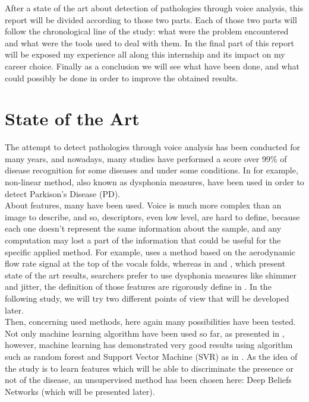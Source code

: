\documentclass{report}
\begin{document}
	After a state of the art about detection of pathologies through voice analysis, this report will be divided according to those two parts. Each of those two parts will follow the chronological line of the study: what were the problem encountered and what were the tools used to deal with them. In the final part of this report will be exposed my experience all along this internship and its impact on my career choice. Finally as a conclusion we will see what have been done, and what could possibly be done in order to improve the obtained results.\\
	
	\chapter{State of the Art}
	
	The attempt to detect pathologies through voice analysis has been conducted for many years, and nowadays, many studies have performed a score over 99\% of disease recognition for some diseases and under some conditions. In \cite{little2006nonlinear} for example, non-linear method, also known as dysphonia measures, have been used in order to detect Parkison's Disease (PD).\\
	
	About features, many have been used. Voice is much more complex than an image to describe, and so, descriptors, even low level, are hard to define, because each one doesn't represent the same information about the sample, and any computation may lost a part of the information that could be useful for the specific applied method. For example, \cite{little2006nonlinear} uses a method based on the aerodynamic flow rate signal at the top of the vocals folds, whereas in \cite{tsanas2012novel} and \cite{tsanas2012using}, which present state of the art results, searchers prefer to use dysphonia measures like shimmer and jitter, the definition of those features are rigorously define in \cite{tsanas2011nonlinear}. In the following study, we will try two different points of view that will be developed later.\\
	
	Then, concerning used methods, here again many possibilities have been tested. Not only machine learning algorithm have been used so far, as presented in \cite{little2006nonlinear}, however, machine learning has demonstrated very good results using algorithm such as random forest and Support Vector Machine (SVR) as in \cite{tsanas2012novel}. As the idea of the study is to learn features which will be able to discriminate the presence or not of the disease, an unsupervised method has been chosen here: Deep Beliefs Networks (which will be presented later).
	
\end{document}
